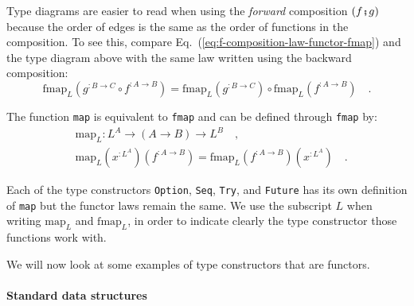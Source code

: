 Type diagrams are easier to read when using the \emph{forward} composition
$\left(f\bef g\right)$ because the order of edges is the same as
the order of functions in the composition. To see this, compare Eq.~(\ref{eq:f-composition-law-functor-fmap})
and the type diagram above with the same law written using the backward
composition:
\[
\text{fmap}_{L}(g^{:B\rightarrow C}\circ f^{:A\rightarrow B})=\text{fmap}_{L}(g^{:B\rightarrow C})\circ\text{fmap}_{L}(f^{:A\rightarrow B})\quad.
\]

The function \lstinline!map! is equivalent to \lstinline!fmap! and
can be defined through \lstinline!fmap! by:
\begin{align*}
 & \text{map}_{L}:L^{A}\rightarrow\left(A\rightarrow B\right)\rightarrow L^{B}\quad,\\
 & \text{map}_{L}(x^{:L^{A}})(f^{:A\rightarrow B})=\text{fmap}_{L}(f^{:A\rightarrow B})(x^{:L^{A}})\quad.
\end{align*}

Each of the type constructors \lstinline!Option!, \lstinline!Seq!,
\lstinline!Try!, and \lstinline!Future! has its own definition of
\lstinline!map! but the functor laws remain the same. We use the
subscript $L$ when writing $\text{map}_{L}$ and $\text{fmap}_{L}$,
in order to indicate clearly the type constructor those functions
work with.

We will now look at some examples of type constructors that are functors.

\paragraph{Standard data structures}

